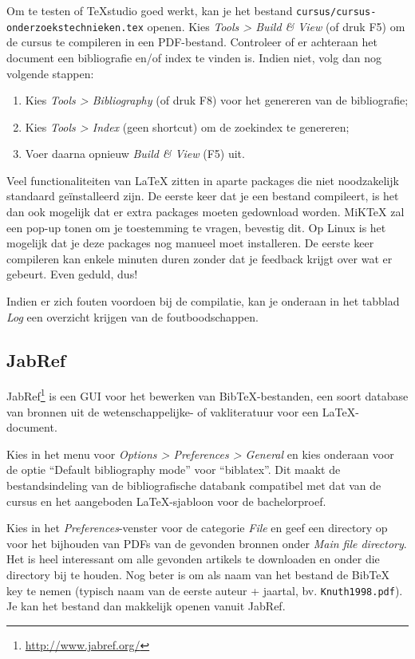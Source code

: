 Om te testen of TeXstudio goed werkt, kan je het bestand \texttt{cursus/cursus-onderzoekstech\-nie\-ken.tex} openen. Kies \emph{Tools > Build \& View} (of druk F5) om de cursus te compileren in een PDF-bestand. Controleer of er achteraan het document een bibliografie en/of index te vinden is. Indien niet, volg dan nog volgende stappen:

\begin{enumerate}
  \item Kies \emph{Tools > Bibliography} (of druk F8) voor het genereren van de bibliografie;
  \item Kies \emph{Tools > Index} (geen shortcut) om de zoekindex te genereren;
  \item Voer daarna opnieuw \emph{Build \& View} (F5) uit.
\end{enumerate}

Veel functionaliteiten van \LaTeX{} zitten in aparte packages die niet noodzakelijk standaard geïnstalleerd zijn. De eerste keer dat je een bestand compileert, is het dan ook mogelijk dat er extra packages moeten gedownload worden. MiK\TeX{} zal een pop-up tonen om je toestemming te vragen, bevestig dit. Op Linux is het mogelijk dat je deze packages nog manueel moet installeren. De eerste keer compileren kan enkele minuten duren zonder dat je feedback krijgt over wat er gebeurt. Even geduld, dus!

Indien er zich fouten voordoen bij de compilatie, kan je onderaan in het tabblad \emph{Log} een overzicht krijgen van de foutboodschappen.

\subsection{JabRef}

JabRef\footnote{\url{http://www.jabref.org/}} is een GUI voor het bewerken van Bib\TeX{}-bestanden, een soort database van bronnen uit de wetenschappelijke- of vakliteratuur voor een \LaTeX{}-document.

Kies in het menu voor \emph{Options > Preferences > General} en kies onderaan voor de optie ``Default bibliography mode'' voor ``biblatex''. Dit maakt de bestandsindeling van de bibliografische databank compatibel met dat van de cursus en het aangeboden \LaTeX{}-sjabloon voor de bachelorproef.

Kies in het \emph{Preferences}-venster voor de categorie \emph{File} en geef een directory op voor het bijhouden van PDFs van de gevonden bronnen onder \emph{Main file directory}. Het is heel interessant om alle gevonden artikels te downloaden en onder die directory bij te houden. Nog beter is om als naam van het bestand de Bib\TeX{} key te nemen (typisch naam van de eerste auteur + jaartal, bv. \texttt{Knuth1998.pdf}). Je kan het bestand dan makkelijk openen vanuit JabRef.

